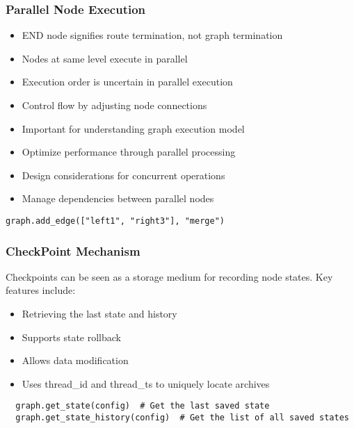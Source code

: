 \begin{frame}[fragile]\frametitle{Parallel Node Execution}
      \begin{itemize}
        \item END node signifies route termination, not graph termination
        \item Nodes at same level execute in parallel
        \item Execution order is uncertain in parallel execution
        \item Control flow by adjusting node connections
        \item Important for understanding graph execution model
        \item Optimize performance through parallel processing
        \item Design considerations for concurrent operations
        \item Manage dependencies between parallel nodes
      \end{itemize}
	  
\begin{lstlisting}	  
graph.add_edge(["left1", "right3"], "merge")	
\end{lstlisting}
\end{frame}

\begin{frame}[fragile]\frametitle{CheckPoint Mechanism}

Checkpoints can be seen as a storage medium for recording node states. Key features include:
      \begin{itemize}
        \item Retrieving the last state and history
        \item Supports state rollback
        \item Allows data modification
        \item Uses thread\_id and thread\_ts to uniquely locate archives
      \end{itemize}
	  
\begin{lstlisting}	  
  graph.get_state(config)  # Get the last saved state
  graph.get_state_history(config)  # Get the list of all saved states	
\end{lstlisting}
\end{frame}


